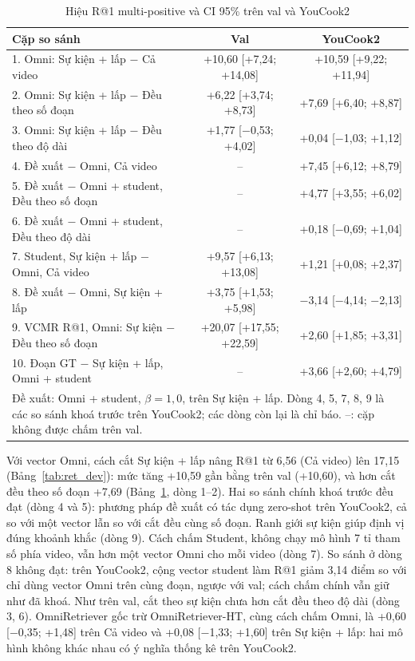 \documentclass{IEEEtran}
\begin{document}
\begin{table}[t]
\caption{Hiệu R@1 multi-positive và CI 95\% trên val và YouCook2}
\label{tab:ret_pairs}
\setlength{\tabcolsep}{2pt}
\centering
\begin{tabular}{|p{82pt}|c|c|}
\hline
Cặp so sánh & Val & YouCook2 \\
\hline
1. Omni: Sự kiện + lấp $-$ Cả video & +10,60 [+7,24; +14,08] & +10,59 [+9,22; +11,94] \\
2. Omni: Sự kiện + lấp $-$ Đều theo số đoạn & +6,22 [+3,74; +8,73] & +7,69 [+6,40; +8,87] \\
3. Omni: Sự kiện + lấp $-$ Đều theo độ dài & +1,77 [$-$0,53; +4,02] & +0,04 [$-$1,03; +1,12] \\
\hline
4. Đề xuất $-$ Omni, Cả video & -- & +7,45 [+6,12; +8,79] \\
5. Đề xuất $-$ Omni + student, Đều theo số đoạn & -- & +4,77 [+3,55; +6,02] \\
6. Đề xuất $-$ Omni + student, Đều theo độ dài & -- & +0,18 [$-$0,69; +1,04] \\
7. Student, Sự kiện + lấp $-$ Omni, Cả video & +9,57 [+6,13; +13,08] & +1,21 [+0,08; +2,37] \\
8. Đề xuất $-$ Omni, Sự kiện + lấp & +3,75 [+1,53; +5,98] & $-$3,14 [$-$4,14; $-$2,13] \\
9. VCMR R@1, Omni: Sự kiện $-$ Đều theo số đoạn & +20,07 [+17,55; +22,59] & +2,60 [+1,85; +3,31] \\
10. Đoạn GT $-$ Sự kiện + lấp, Omni + student & -- & +3,66 [+2,60; +4,79] \\
\hline
\multicolumn{3}{p{236pt}}{Đề xuất: Omni + student, $\beta = 1{,}0$, trên Sự kiện + lấp. Dòng 4, 5, 7, 8, 9 là các so sánh khoá trước trên YouCook2; các dòng còn lại là chỉ báo. --: cặp không được chấm trên val.}
\end{tabular}
\end{table}

Với vector Omni, cách cắt Sự kiện + lấp nâng R@1 từ 6,56 (Cả video) lên 17,15 (Bảng~\ref{tab:ret_dev}): mức tăng +10,59 gần bằng trên val (+10,60), và hơn cắt đều theo số đoạn +7,69 (Bảng~\ref{tab:ret_pairs}, dòng 1--2). Hai so sánh chính khoá trước đều đạt (dòng 4 và 5): phương pháp đề xuất có tác dụng zero-shot trên YouCook2, cả so với một vector lẫn so với cắt đều cùng số đoạn. Ranh giới sự kiện giúp định vị đúng khoảnh khắc (dòng 9). Cách chấm Student, không chạy mô hình 7 tỉ tham số phía video, vẫn hơn một vector Omni cho mỗi video (dòng 7). So sánh ở dòng 8 không đạt: trên YouCook2, cộng vector student làm R@1 giảm 3,14 điểm so với chỉ dùng vector Omni trên cùng đoạn, ngược với val; cách chấm chính vẫn giữ như đã khoá. Như trên val, cắt theo sự kiện chưa hơn cắt đều theo độ dài (dòng 3, 6). OmniRetriever gốc trừ OmniRetriever-HT, cùng cách chấm Omni, là +0,60 [$-$0,35; +1,48] trên Cả video và +0,08 [$-$1,33; +1,60] trên Sự kiện + lấp: hai mô hình không khác nhau có ý nghĩa thống kê trên YouCook2.
\end{document}
